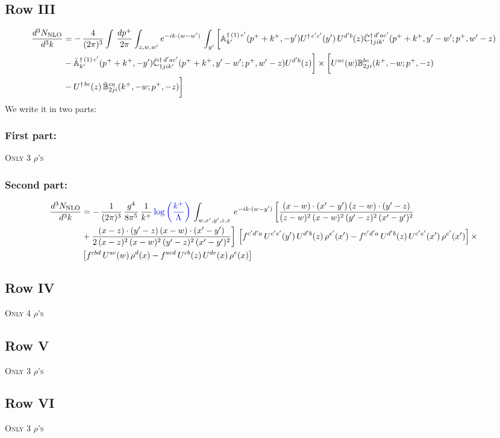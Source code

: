 \documentclass[9pt]{article}
\def\mf#1{\mathbb{#1}}
\numberwithin{equation}{section}
\begin{document}
 \subsection{Row III}
 \begin{align}
    \frac{d^{3}N_{\rm NLO}}{d^{3}k} & =   -\,\frac{4}{(2\pi)^{3}} \int\, \frac{dp^{+}}{2\pi}\int_{z,w,w^{\prime}} e^{-ik\cdot (w-w')}\,\int_{y^{\prime}}\bigg[\mf{A}^{\dagger\, (1)\,e^{\prime}}_{k^{\prime}}(p^{+}+k^{+},-y^{\prime})U^{\dagger\, e^{\prime}c^{\prime}}(y^{\prime})\,U^{d^{\prime}b}(z) \Bar{\mf{C}}^{\dagger\, d^{\prime}ac^{\prime}}_{1jik^{\prime}}(p^{+}+k^{+},y^{\prime}-w^{\prime}; p^{+},w^{\prime}-z)\notag \\ &  -\Bar{\mf{A}}^{\dagger\, (1)\,c^{\prime}}_{k^{\prime}}(p^{+}+k^{+},-y^{\prime}) \Bar{\mf{C}}^{\dagger\, d^{\prime}ac^{\prime}}_{1jik^{\prime}}(p^{+}+k^{+},y^{\prime}-w^{\prime}; p^{+},w^{\prime}-z)U^{d^{\prime}b}(z)\bigg] \times \bigg[U^{ac}(w) \mf{B}^{bc}_{2ji}(k^{+},-w;p^{+},-z)\notag \\ &  -U^{\dagger\, bc}(z)\,\Bar{\mf{B}}^{ca}_{2ji}(k^{+},-w; p^{+},-z)\bigg]\nonumber
\end{align}
We write it in two parts:
\subsubsection{First part:}
\textsc{Only 3 $\rho$'s}
\subsubsection{Second part:}
\begin{align}
 \frac{d^{3}N_{\rm NLO}}{d^{3}k} & =  -\, \frac{1}{(2\pi)^{3}}\,\frac{g^{4}}{8\pi^{5}}\,\frac{1}{k^{+}}\,{\color{blue}\log{\left(\frac{k^{+}}{\Lambda}\right)}}\,\int_{w,x',y',z,x}\, e^{-ik\cdot (w-y')}\,\bigg[\frac{(x-w)\cdot (x'-y')\,(z-w)\cdot (y'-z)}{(z-w)^{2}\,(x-w)^{2}\,(y'-z)^{2}\,(x'-y')^{2}}\notag \\ & +\frac{(x-z)\cdot (y'-z)\,(x-w)\cdot (x'-y')}{2\,(x-z)^{2}\,(x-w)^{2}\,(y'-z)^{2}\,(x'-y')^{2}}\bigg]\, \left[f^{c'd'a}\,U^{c'e'}(y')\,U^{d'b}(z)\,\rho^{e'}(x')-f^{c'd'a}\, 
    U^{d'b}(z)\,U^{c'e'}(x')\,\rho^{e'}(x')\right]\times\notag \\ &  \left[f^{cbd}\,U^{ac}(w)\,\rho^{d}(x) -f^{acd}\,U^{cb}(z)\,U^{de}(x)\,\rho^{e}(x)\right] 
\end{align}
\subsection{Row IV}
\textsc{Only 4 $\rho$'s}
\subsection{Row V}
\textsc{Only 3 $\rho$'s}
\subsection{Row VI}
\textsc{Only 3 $\rho$'s}
\end{document}
